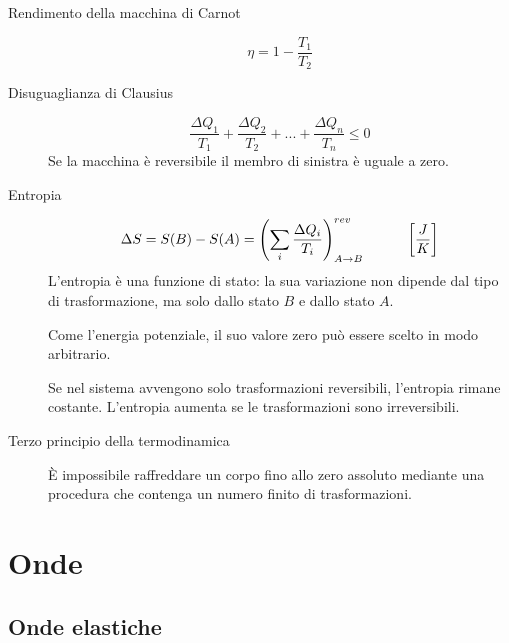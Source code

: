 \documentclass[a4paper,11pt,italian]{article}
\begin{document}
\begin{description}
  \item[Rendimento della macchina di Carnot] 
  \[ \eta = 1 - \frac{T_1}{T_2} \]

  \item[Disuguaglianza di Clausius] 
  \[ \frac{\Delta Q_1}{T_1} + \frac{\Delta Q_2}{T_2} + ... + \frac{\Delta Q_n}{T_n} \leq 0  \]
  Se la macchina è reversibile il membro di sinistra è uguale a zero.

  \item[Entropia]
  \[ \Delta S = S(B) - S(A) = \left( \sum_i \frac{\Delta Q_i}{T_i} \right)^{rev}_{A \rightarrow B} \hspace*{3em} \left[ \frac{J}{K} \right]\]
  L'entropia è una funzione di stato: la sua variazione non dipende dal tipo di trasformazione, ma solo dallo stato $ B $ e dallo stato $ A $.
  
  Come l'energia potenziale, il suo valore zero può essere scelto in modo arbitrario.
  
  Se nel sistema avvengono solo trasformazioni reversibili, l'entropia rimane costante. L'entropia aumenta se le trasformazioni sono irreversibili.

  \item[Terzo principio della termodinamica] È impossibile raffreddare un corpo fino allo zero assoluto mediante una procedura che contenga un numero finito di trasformazioni.
\end{description}


\newpage
\section{Onde}

\subsection{Onde elastiche}
\end{document}

